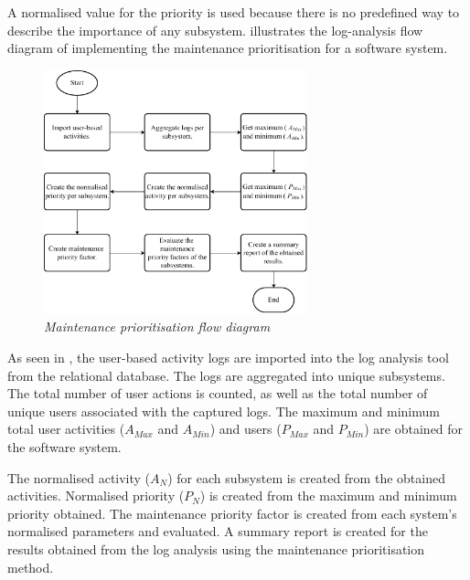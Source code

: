 \clearpage

A normalised value for the priority is used because there is no predefined way to describe the importance of any subsystem.  illustrates the log-analysis flow diagram of implementing the maintenance prioritisation for a software system. 

\begin{figure}[!htb]
	\centering
	\includegraphics[width=0.68\textwidth]{img/Chapter2/maintenancePriortisation/maintenancePriortisation.pdf}
	\caption[Maintenance prioritisation flow diagram]
	{\textit{Maintenance prioritisation flow diagram}}\label{fig:ch2_maintenancePriortisationFlow}
\end{figure}

As seen in , the user-based activity logs are imported into the log analysis tool from the relational database. The logs are aggregated into unique subsystems. The total number of user actions is counted, as well as the total number of unique users associated with the captured logs. The maximum and minimum total user activities ($A_{Max}$ and $A_{Min}$) and users ($P_{Max}$ and $P_{Min}$) are obtained for the software system. \par The normalised activity ($A_N$) for each subsystem is created from the obtained activities. Normalised priority ($P_N$) is created from the maximum and minimum priority obtained. The maintenance priority factor is created from each system's normalised parameters and evaluated. A summary report is created for the results obtained from the log analysis using the maintenance prioritisation method.

\clearpage

